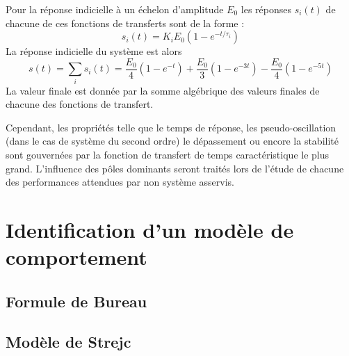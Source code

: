 Pour la réponse indicielle à un échelon d'amplitude $E_0$ les 
réponses $s_i(t)$ de chacune de ces fonctions de transferts sont de la 
forme :
\[
s_i(t)=K_iE_0\left(1-e^{-t/\tau_i}\right)
\]
La réponse indicielle du système est alors
\[
s(t)=\sum_i s_i(t) = 
\dfrac{E_0}{4}\left(1-e^{-t}\right)+
\dfrac{E_0}{3}\left(1-e^{-3t}\right)-
\dfrac{E_0}{4}\left(1-e^{-5t}\right)
\]
La valeur finale est donnée par la somme algébrique des valeurs finales de 
chacune des fonctions de transfert.

Cependant, les propriétés telle que le temps de réponse, 
les pseudo-oscillation (dans le cas de système du second ordre) 
le dépassement ou encore la stabilité sont gouvernées 
par la fonction de transfert de temps caractéristique le plus grand. 
L'influence des pôles dominants seront traités lors de l'étude 
de chacune des performances attendues par non système asservis.
\section{Identification d'un modèle de comportement}
\subsection{Formule de Bureau}
\acplhp
\subsection{Modèle de Strejc}
\acplhp
